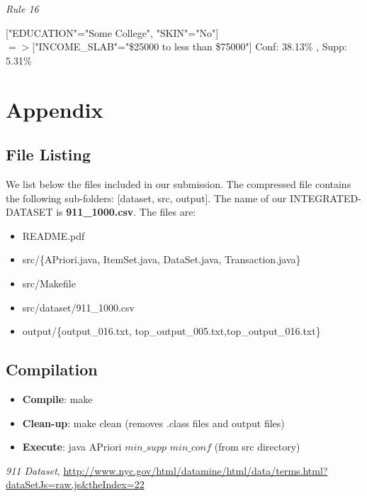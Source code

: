 \documentclass[11pt]{article}
\begin{document}
\textit{Rule 16}

["EDUCATION"="Some College", "SKIN"="No"]\\
$=>$["INCOME\_SLAB"="\$25000 to less than \$75000"] Conf: 38.13\% , Supp: 5.31\% 

\section* {Appendix}

\subsection* {File Listing}

We list below the files included in our submission. The compressed file contains the following sub-folders: [dataset, src, output].
The name of our INTEGRATED-DATASET  is \textbf{911\_1000.csv}.
The files are:
\begin{itemize}
\item README.pdf
\item src/\{APriori.java, ItemSet.java, DataSet.java, Transaction.java\}
\item src/Makefile
\item src/dataset/911\_1000.csv
\item output/\{output\_016.txt, top\_output\_005.txt,top\_output\_016.txt\}
\end{itemize}

\subsection* {Compilation}
\begin{itemize}
\item \textbf{Compile}: make
\item \textbf{Clean-up}: make clean (removes .class files and output files)
\item\textbf{Execute}: java APriori  $min\_supp$ $min\_conf$ (from src directory)

\end{itemize}


\begin{thebibliography}{50}
 \textit{911 Dataset}, \url{http://www.nyc.gov/html/datamine/html/data/terms.html?dataSetJs=raw.js&theIndex=22}
\end{thebibliography}
\end{document}
